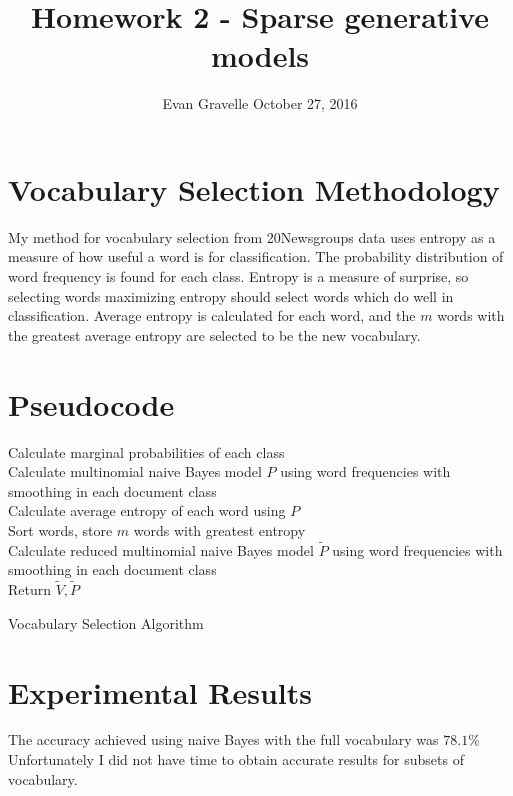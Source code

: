 \documentclass[letterpaper,10pt,onecolumn]{IEEEconf}
\begin{document}
\title{Homework 2 - Sparse generative models}
\author{Evan Gravelle \quad \quad October 27, 2016}
\maketitle

\section{Vocabulary Selection Methodology}

My method for vocabulary selection from 20Newsgroups data uses entropy as a measure of how useful a word is for classification. The probability distribution of word frequency is found for each class. Entropy is a measure of surprise, so selecting words maximizing entropy should select words which do well in classification. Average entropy is calculated for each word, and the $m$ words with the greatest average entropy are selected to be the new vocabulary.

\section{Pseudocode}

\begin{algorithm}[H]
\SetAlgoLined
\DontPrintSemicolon
{}
\BlankLine
Calculate marginal probabilities of each class \\
Calculate multinomial naive Bayes model $P$ using word frequencies with smoothing in each document class \\
Calculate average entropy of each word using $P$ \\
Sort words, store $m$ words with greatest entropy \\
Calculate reduced multinomial naive Bayes model $\tilde{P}$ using word frequencies with smoothing in each document class \\
Return $\tilde{V}, \tilde{P}$
\caption{Vocabulary Selection Algorithm}
\end{algorithm}

\section{Experimental Results}

The accuracy achieved using naive Bayes with the full vocabulary was $78.1\%$ Unfortunately I did not have time to obtain accurate results for subsets of vocabulary.
\end{document}
